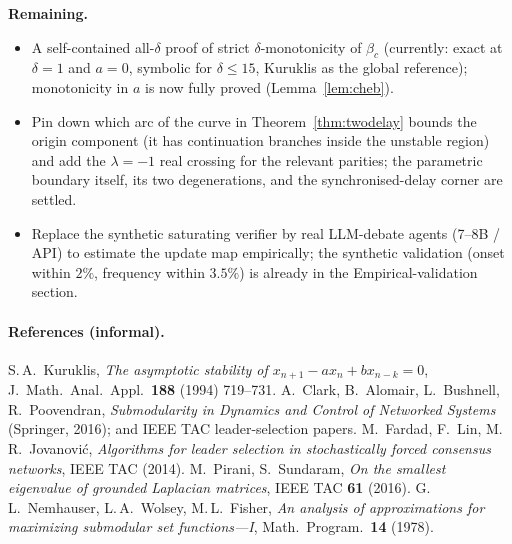\documentclass[11pt]{article}
\theoremstyle{definition}
\begin{document}
\textbf{Remaining.}
\begin{itemize}
  \item A self-contained all-$\delta$ proof of strict $\delta$-monotonicity of $\beta_c$
        (currently: exact at $\delta{=}1$ and $a{=}0$, symbolic for $\delta\le15$, Kuruklis as the
        global reference); monotonicity in $a$ is now fully proved (Lemma~\ref{lem:cheb}).
  \item Pin down which arc of the curve in Theorem~\ref{thm:twodelay} bounds the origin
        component (it has continuation branches inside the unstable region) and add the
        $\lambda=-1$ real crossing for the relevant parities; the parametric boundary itself, its
        two degenerations, and the synchronised-delay corner are settled.
  \item Replace the synthetic saturating verifier by real LLM-debate agents (7--8B / API) to
        estimate the update map empirically; the synthetic validation (onset within $2\%$,
        frequency within $3.5\%$) is already in the Empirical-validation section.
\end{itemize}

\paragraph{References (informal).}
S.\,A.\ Kuruklis, \emph{The asymptotic stability of $x_{n+1}-a x_n+b x_{n-k}=0$}, J.\ Math.\
Anal.\ Appl.\ \textbf{188} (1994) 719--731.\;
A.\ Clark, B.\ Alomair, L.\ Bushnell, R.\ Poovendran, \emph{Submodularity in Dynamics and Control
of Networked Systems} (Springer, 2016); and IEEE TAC leader-selection papers.\;
M.\ Fardad, F.\ Lin, M.\,R.\ Jovanovi\'c, \emph{Algorithms for leader selection in stochastically
forced consensus networks}, IEEE TAC (2014).\;
M.\ Pirani, S.\ Sundaram, \emph{On the smallest eigenvalue of grounded Laplacian matrices}, IEEE
TAC \textbf{61} (2016).\;
G.\,L.\ Nemhauser, L.\,A.\ Wolsey, M.\,L.\ Fisher, \emph{An analysis of approximations for
maximizing submodular set functions---I}, Math.\ Program.\ \textbf{14} (1978).
\end{document}
